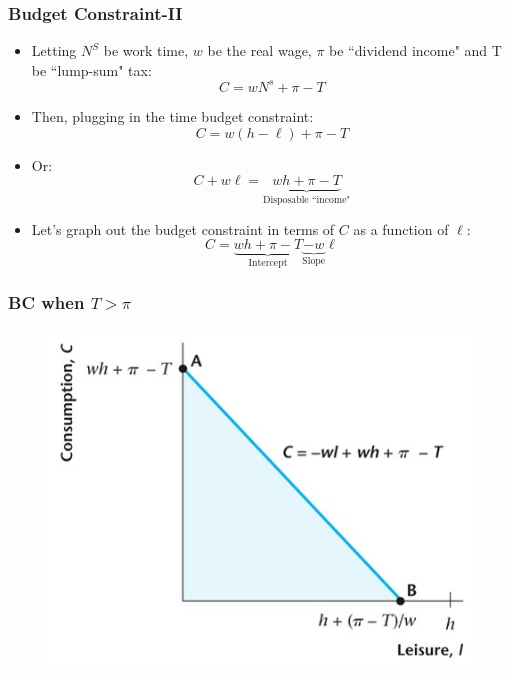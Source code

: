 \documentclass{beamer}
\begin{document}
\begin{frame}
\frametitle[alignment=center]{Budget Constraint-II}
\begin{itemize}
\item Letting $N^S$ be work time, $w$ be the real wage, $\pi$ be ``dividend income" and T be ``lump-sum" tax:
$$C=wN^s+\pi-T$$
\item Then, plugging in the time budget constraint:
$$C=w(h-\ell)+\pi-T$$
\item Or:
$$C+w\ell=\underbrace{wh+\pi-T}_{\text{Disposable ``income"}}$$
\item Let's graph out the budget constraint in terms of $C$ as a function of $\ell$:
$$C=\underbrace{wh+\pi-T}_{\text{Intercept}}\underbrace{-w}_{\text{Slope}}\ell$$
\end{itemize}
\end{frame}

\begin{frame}
\frametitle[alignment=center]{BC when $T>\pi$}
\begin{figure}
\centering
\includegraphics[scale=0.5]{Figures/W_Fig_4pt3.png}
\end{figure}
\end{frame}
\end{document}
